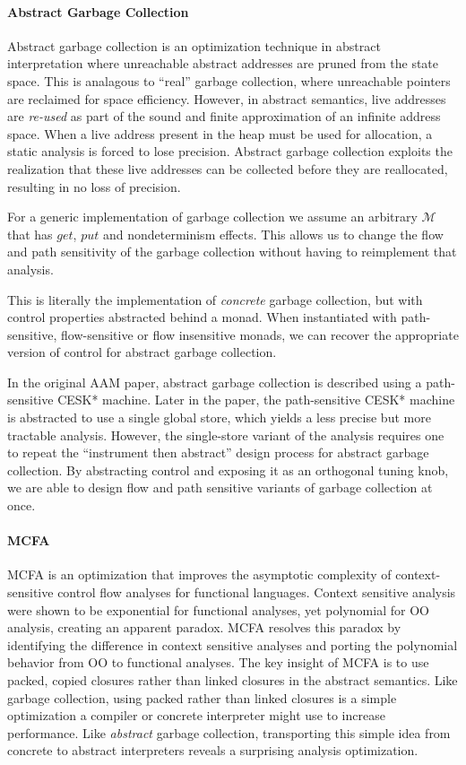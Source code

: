 \documentclass{article}
\begin{document}
\paragraph{Abstract Garbage Collection}
Abstract garbage collection is an optimization technique in abstract interpretation where unreachable abstract addresses are pruned from the state space.
This is analagous to “real” garbage collection, where unreachable pointers are reclaimed for space efficiency.
However, in abstract semantics, live addresses are \emph{re-used} as part of the sound and finite approximation of an infinite address space.
When a live address present in the heap must be used for allocation, a static analysis is forced to lose precision.
Abstract garbage collection exploits the realization that these live addresses can be collected before they are reallocated, resulting in no loss of precision.

For a generic implementation of garbage collection we assume an arbitrary $ℳ $ that has $get$, $put$ and nondeterminism effects.
This allows us to change the flow and path sensitivity of the garbage collection without having to reimplement that analysis.

This is literally the implementation of \emph{concrete} garbage collection, but with control properties abstracted behind a monad.
When instantiated with path-sensitive, flow-sensitive or flow insensitive monads, we can recover the appropriate version of control for abstract garbage collection.

In the original AAM paper, abstract garbage collection is described using a path-sensitive CESK* machine.
Later in the paper, the path-sensitive CESK* machine is abstracted to use a single global store, which yields a less precise but more tractable analysis.
However, the single-store variant of the analysis requires one to repeat the “instrument then abstract” design process for abstract garbage collection.
By abstracting control and exposing it as an orthogonal tuning knob, we are able to design flow and path sensitive variants of garbage collection at once.

\paragraph{MCFA}

MCFA is an optimization that improves the asymptotic complexity of context-sensitive control flow analyses for functional languages.
Context sensitive analysis were shown to be exponential for functional analyses, yet polynomial for OO analysis, creating an apparent paradox.
MCFA resolves this paradox by identifying the difference in context sensitive analyses and porting the polynomial behavior from OO to functional analyses.
The key insight of MCFA is to use packed, copied closures rather than linked closures in the abstract semantics.
Like garbage collection, using packed rather than linked closures is a simple optimization a compiler or concrete interpreter might use to increase performance.
Like \emph{abstract} garbage collection, transporting this simple idea from concrete to abstract interpreters reveals a surprising analysis optimization.
\end{document}

